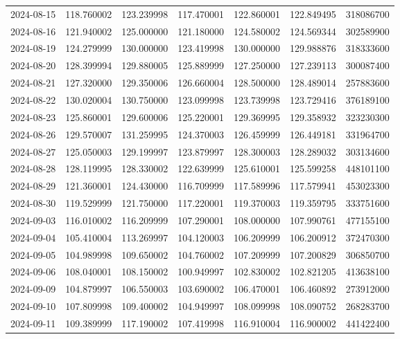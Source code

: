\begin{tabular}{lrrrrrr}
2024-08-15 &  118.760002 &  123.239998 &  117.470001 &  122.860001 &  122.849495 &   318086700 \\
2024-08-16 &  121.940002 &  125.000000 &  121.180000 &  124.580002 &  124.569344 &   302589900 \\
2024-08-19 &  124.279999 &  130.000000 &  123.419998 &  130.000000 &  129.988876 &   318333600 \\
2024-08-20 &  128.399994 &  129.880005 &  125.889999 &  127.250000 &  127.239113 &   300087400 \\
2024-08-21 &  127.320000 &  129.350006 &  126.660004 &  128.500000 &  128.489014 &   257883600 \\
2024-08-22 &  130.020004 &  130.750000 &  123.099998 &  123.739998 &  123.729416 &   376189100 \\
2024-08-23 &  125.860001 &  129.600006 &  125.220001 &  129.369995 &  129.358932 &   323230300 \\
2024-08-26 &  129.570007 &  131.259995 &  124.370003 &  126.459999 &  126.449181 &   331964700 \\
2024-08-27 &  125.050003 &  129.199997 &  123.879997 &  128.300003 &  128.289032 &   303134600 \\
2024-08-28 &  128.119995 &  128.330002 &  122.639999 &  125.610001 &  125.599258 &   448101100 \\
2024-08-29 &  121.360001 &  124.430000 &  116.709999 &  117.589996 &  117.579941 &   453023300 \\
2024-08-30 &  119.529999 &  121.750000 &  117.220001 &  119.370003 &  119.359795 &   333751600 \\
2024-09-03 &  116.010002 &  116.209999 &  107.290001 &  108.000000 &  107.990761 &   477155100 \\
2024-09-04 &  105.410004 &  113.269997 &  104.120003 &  106.209999 &  106.200912 &   372470300 \\
2024-09-05 &  104.989998 &  109.650002 &  104.760002 &  107.209999 &  107.200829 &   306850700 \\
2024-09-06 &  108.040001 &  108.150002 &  100.949997 &  102.830002 &  102.821205 &   413638100 \\
2024-09-09 &  104.879997 &  106.550003 &  103.690002 &  106.470001 &  106.460892 &   273912000 \\
2024-09-10 &  107.809998 &  109.400002 &  104.949997 &  108.099998 &  108.090752 &   268283700 \\
2024-09-11 &  109.389999 &  117.190002 &  107.419998 &  116.910004 &  116.900002 &   441422400 \\

\end{tabular}
